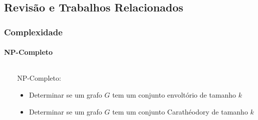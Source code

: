 \subsection{Revisão e Trabalhos Relacionados}
\begin{frame}
\frametitle{Complexidade}
\framesubtitle{NP-Completo}
 \begin{columns}[T]
    \begin{column}{.5\textwidth}
    \centering
    \end{column}
    \begin{column}{.5\textwidth}
        NP-Completo:
        \begin{itemize}
            \item{Determinar se um grafo $G$ tem um conjunto envoltório de tamanho $k$}
            \item{Determinar se um grafo $G$ tem um conjunto Carathéodory de tamanho $k$}
        \end{itemize}
    \end{column}
  \end{columns}
\end{frame}

